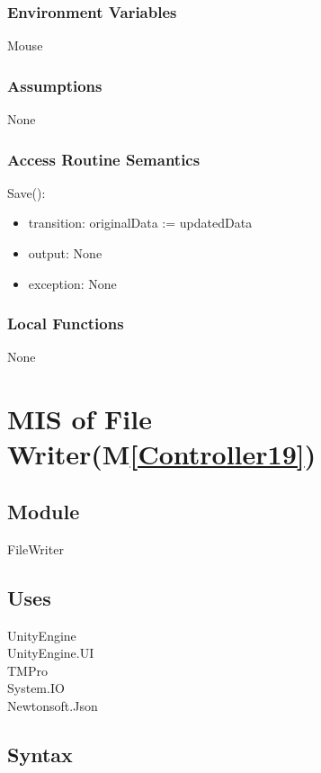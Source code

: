 \documentclass[12pt, titlepage]{article}
\newcommand{\mref}[1]{M\ref{#1}}
\begin{document}
\subsubsection{Environment Variables}
Mouse
\subsubsection{Assumptions}
None
\subsubsection{Access Routine Semantics}

\noindent Save():
\begin{itemize}
\item transition: originalData := updatedData
\item output: None
\item exception: None
\end{itemize}


\subsubsection{Local Functions}
None


\newpage


\section{MIS of File Writer(\mref{Controller19})}  

\subsection{Module}

FileWriter

\subsection{Uses}
UnityEngine\\
UnityEngine.UI\\
TMPro\\
System.IO\\
Newtonsoft.Json\\

\subsection{Syntax}
\end{document}
